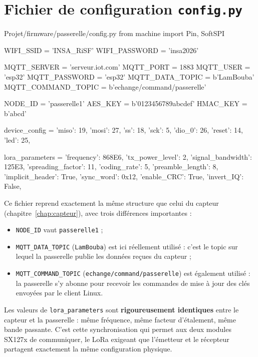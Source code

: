 \documentclass[a4paper,11pt]{report}
\begin{document}
\section{Fichier de configuration \texttt{config.py}}

\begin{pycode}{Projet/firmware/passerelle/config.py}
from machine import Pin, SoftSPI

WIFI_SSID = 'INSA_RiSF'
WIFI_PASSWORD = 'insa2026'

MQTT_SERVER = 'serveur.iot.com'
MQTT_PORT = 1883
MQTT_USER = 'esp32'
MQTT_PASSWORD = 'esp32'
MQTT_DATA_TOPIC = b'LamBouba'
MQTT_COMMAND_TOPIC = b'echange/command/passerelle'

NODE_ID = 'passerelle1'
AES_KEY = b'0123456789abcdef'
HMAC_KEY = b'abcd'

device_config = {
    'miso': 19,
    'mosi': 27,
    'ss': 18,
    'sck': 5,
    'dio_0': 26,
    'reset': 14,
    'led': 25,
}

lora_parameters = {
    'frequency': 868E6,
    'tx_power_level': 2,
    'signal_bandwidth': 125E3,
    'spreading_factor': 11,
    'coding_rate': 5,
    'preamble_length': 8,
    'implicit_header': True,
    'sync_word': 0x12,
    'enable_CRC': True,
    'invert_IQ': False,
}
\end{pycode}

Ce fichier reprend exactement la même structure que celui du capteur (chapitre~\ref{chap:capteur}), avec
trois différences importantes :
\begin{itemize}
    \item \texttt{NODE\_ID} vaut \texttt{passerelle1} ;
    \item \texttt{MQTT\_DATA\_TOPIC} (\texttt{LamBouba}) est ici réellement utilisé : c'est le topic sur
    lequel la passerelle publie les données reçues du capteur ;
    \item \texttt{MQTT\_COMMAND\_TOPIC} (\texttt{echange/command/passerelle}) est également utilisé : la
    passerelle s'y abonne pour recevoir les commandes de mise à jour des clés envoyées par le client Linux.
\end{itemize}

\begin{explication}
Les valeurs de \texttt{lora\_parameters} sont \textbf{rigoureusement identiques} entre le capteur et la
passerelle : même fréquence, même facteur d'étalement, même bande passante. C'est cette synchronisation
qui permet aux deux modules SX127x de communiquer, le LoRa exigeant que l'émetteur et le récepteur
partagent exactement la même configuration physique.
\end{explication}
\end{document}
